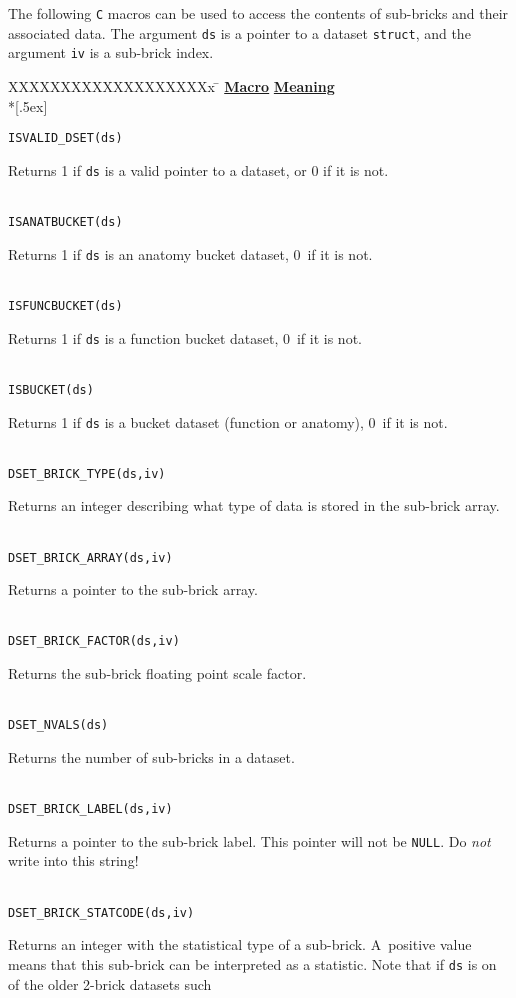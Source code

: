 The following {\tt C} macros can be used to access the contents
of sub-bricks and their associated data.
The argument {\tt ds} is a pointer to a dataset {\tt struct},
and the argument {\tt iv} is a sub-brick index.
\vset
\renewcommand{\tb}[1]{\parbox[t]{3.99in}{\sloppy #1}}
\begin{tabbing}
  XXXXXXXXXXXXXXXXXXXx \= \kill
%
\underline{\bf Macro} \> \underline{\bf Meaning} \\*[.5ex]

{\tt ISVALID\_DSET(ds)} \> \tb{Returns 1 if {\tt ds} is a valid pointer
                              to a dataset, or 0 if it is not.}
\\[.9ex]
{\tt ISANATBUCKET(ds)} \> \tb{Returns 1 if {\tt ds} is an anatomy
                              bucket dataset, 0~if it is not.}
\\[.9ex]
{\tt ISFUNCBUCKET(ds)} \> \tb{Returns 1 if {\tt ds} is a function
                              bucket dataset, 0~if it is not.}
\\[.9ex]
{\tt ISBUCKET(ds)}     \> \tb{Returns 1 if {\tt ds} is a 
                              bucket dataset (function or anatomy), 0~if it is not.}
\\[.9ex]
{\tt DSET\_BRICK\_TYPE(ds,iv)} \> \tb{Returns an integer describing what type
                                    of data is stored in the sub-brick array.}
\\[.9ex]
{\tt DSET\_BRICK\_ARRAY(ds,iv)} \> \tb{Returns a pointer to the sub-brick array.}
\\[.9ex]
{\tt DSET\_BRICK\_FACTOR(ds,iv)} \> \tb{Returns the sub-brick floating point
                                      scale factor.}
\\[.9ex]
{\tt DSET\_NVALS(ds)} \> \tb{Returns the number of sub-bricks in a dataset.}
\\[.9ex]
{\tt DSET\_BRICK\_LABEL(ds,iv)} \> \tb{Returns a pointer to the sub-brick label.
                                     This pointer will not be {\tt NULL}.  Do {\it not\/}
                                     write into this string!}
\\[.9ex]
{\tt DSET\_BRICK\_STATCODE(ds,iv)} \> \tb{Returns an integer with the statistical
                                        type of a sub-brick.  A~positive value
                                        means that this sub-brick can be interpreted
                                        as a statistic.  Note that if {\tt ds} is
                                        on of the older 2-brick datasets such
}
\end{tabbing}

